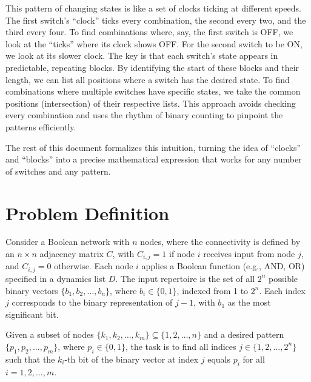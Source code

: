 \documentclass[12pt]{article}
\begin{document}
This pattern of changing states is like a set of clocks ticking at different speeds. The first switch’s ``clock'' ticks every combination, the second every two, and the third every four. To find combinations where, say, the first switch is OFF, we look at the ``ticks'' where its clock shows OFF. For the second switch to be ON, we look at its slower clock. The key is that each switch’s state appears in predictable, repeating blocks. By identifying the start of these blocks and their length, we can list all positions where a switch has the desired state. To find combinations where multiple switches have specific states, we take the common positions (intersection) of their respective lists. This approach avoids checking every combination and uses the rhythm of binary counting to pinpoint the patterns efficiently.

The rest of this document formalizes this intuition, turning the idea of ``clocks'' and ``blocks'' into a precise mathematical expression that works for any number of switches and any pattern.

\section{Problem Definition}
Consider a Boolean network with \( n \) nodes, where the connectivity is defined by an \( n \times n \) adjacency matrix \( C \), with \( C_{i,j} = 1 \) if node \( i \) receives input from node \( j \), and \( C_{i,j} = 0 \) otherwise. Each node \( i \) applies a Boolean function (e.g., AND, OR) specified in a dynamics list \( D \). The input repertoire is the set of all \( 2^n \) possible binary vectors \( \{b_1, b_2, \dots, b_n\} \), where \( b_i \in \{0, 1\} \), indexed from 1 to \( 2^n \). Each index \( j \) corresponds to the binary representation of \( j-1 \), with \( b_1 \) as the most significant bit.

Given a subset of nodes \( \{k_1, k_2, \dots, k_m\} \subseteq \{1, 2, \dots, n\} \) and a desired pattern \( \{p_1, p_2, \dots, p_m\} \), where \( p_i \in \{0, 1\} \), the task is to find all indices \( j \in \{1, 2, \dots, 2^n\} \) such that the \( k_i \)-th bit of the binary vector at index \( j \) equals \( p_i \) for all \( i = 1, 2, \dots, m \).
\end{document}
